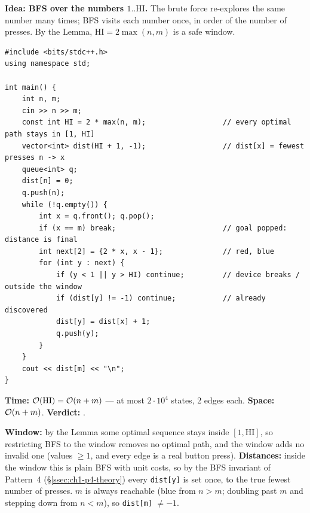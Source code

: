 \begin{algorithmbox}
\textbf{Idea: BFS over the numbers $1..\text{HI}$.} The brute force re-explores the same number many times; BFS visits each number once, in order of the number of presses. By the Lemma, $\text{HI} = 2\max(n, m)$ is a safe window.

\begin{lstlisting}[style=cpp]
#include <bits/stdc++.h>
using namespace std;

int main() {
    int n, m;
    cin >> n >> m;
    const int HI = 2 * max(n, m);                  // every optimal path stays in [1, HI]
    vector<int> dist(HI + 1, -1);                  // dist[x] = fewest presses n -> x
    queue<int> q;
    dist[n] = 0;
    q.push(n);
    while (!q.empty()) {
        int x = q.front(); q.pop();
        if (x == m) break;                         // goal popped: distance is final
        int next[2] = {2 * x, x - 1};              // red, blue
        for (int y : next) {
            if (y < 1 || y > HI) continue;         // device breaks / outside the window
            if (dist[y] != -1) continue;           // already discovered
            dist[y] = dist[x] + 1;
            q.push(y);
        }
    }
    cout << dist[m] << "\n";
}
\end{lstlisting}

\begin{complexitybox}
\textbf{Time:} $\mathcal{O}(\text{HI}) = \mathcal{O}(n + m)$ --- at most $2\cdot10^4$ states, 2 edges each. \textbf{Space:} $\mathcal{O}(n + m)$. \textbf{Verdict:} \ac{}.
\end{complexitybox}
\end{algorithmbox}

\begin{invariantbox}
\textbf{Window:} by the Lemma some optimal sequence stays inside $[1, \text{HI}]$, so restricting BFS to the window removes no optimal path, and the window adds no invalid one (values $\ge 1$, and every edge is a real button press).
\textbf{Distances:} inside the window this is plain BFS with unit costs, so by the BFS invariant of Pattern~4 (\S\ref{ssec:ch1-p4-theory}) every \texttt{dist[y]} is set once, to the true fewest number of presses. $m$ is always reachable (blue from $n > m$; doubling past $m$ and stepping down from $n < m$), so \texttt{dist[m]} $\ne -1$.
\end{invariantbox}


